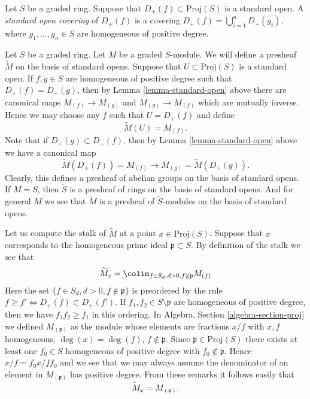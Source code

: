 \begin{definition}
\label{definition-standard-covering}
Let $S$ be a graded ring.
Suppose that $D_{+}(f) \subset \text{Proj}(S)$ is a standard
open. A {\it standard open covering} of $D_{+}(f)$
is a covering $D_{+}(f) = \bigcup_{i = 1}^n D_{+}(g_i)$,
where $g_1, \ldots, g_n \in S$ are homogeneous of positive degree.
\end{definition}

\noindent
Let $S$ be a graded ring. Let $M$ be a graded $S$-module. We will define
a presheaf $\widetilde M$ on the basis of standard opens.
Suppose that $U \subset \text{Proj}(S)$ is a standard open.
If $f, g \in S$ are homogeneous of positive degree
such that $D_{+}(f) = D_{+}(g)$, then
by Lemma \ref{lemma-standard-open} above there are canonical
maps $M_{(f)} \to M_{(g)}$ and $M_{(g)} \to M_{(f)}$ which are
mutually inverse. Hence we may choose any $f$ such that $U = D_{+}(f)$
and define
$$
\widetilde M(U) = M_{(f)}.
$$
Note that if $D_{+}(g) \subset D_{+}(f)$, then by
Lemma \ref{lemma-standard-open} above we have
a canonical map
$$
\widetilde M(D_{+}(f)) = M_{(f)} \longrightarrow
M_{(g)} = \widetilde M(D_{+}(g)).
$$
Clearly, this defines a presheaf of abelian groups on the basis
of standard opens. If $M = S$, then $\widetilde S$ is a presheaf
of rings on the basis of standard opens. And for general $M$ we
see that $\widetilde M$ is a presheaf of $\widetilde S$-modules
on the basis of standard opens.

\medskip\noindent
Let us compute the stalk of $\widetilde M$ at a point
$x \in \text{Proj}(S)$.
Suppose that $x$ corresponds to the homogeneous prime
ideal $\mathfrak p \subset S$.
By definition of the stalk we see that
$$
\widetilde M_x
=
\colim_{f\in S_d, d > 0, f\not\in \mathfrak p} M_{(f)}
$$
Here the set $\{f \in S_d, d > 0, f \not \in \mathfrak p\}$ is preordered by
the rule $f \geq f' \Leftrightarrow D_{+}(f) \subset D_{+}(f')$.
If $f_1, f_2 \in S \setminus \mathfrak p$ are homogeneous of positive
degree, then we have
$f_1f_2 \geq f_1$ in this ordering. In
Algebra, Section \ref{algebra-section-proj}
we defined $M_{(\mathfrak p)}$ as the module whose elements are fractions
$x/f$ with $x, f$ homogeneous, $\deg(x) = \deg(f)$, $f \not \in \mathfrak p$.
Since $\mathfrak p \in \text{Proj}(S)$ there exists at least
one $f_0 \in S$ homogeneous of positive degree with $f_0 \not\in \mathfrak p$.
Hence $x/f = f_0x/ff_0$ and we see that we may always assume
the denominator of an element in $M_{(\mathfrak p)}$ has positive degree.
From these remarks it follows easily that
$$
\widetilde M_x = M_{(\mathfrak p)}.
$$

